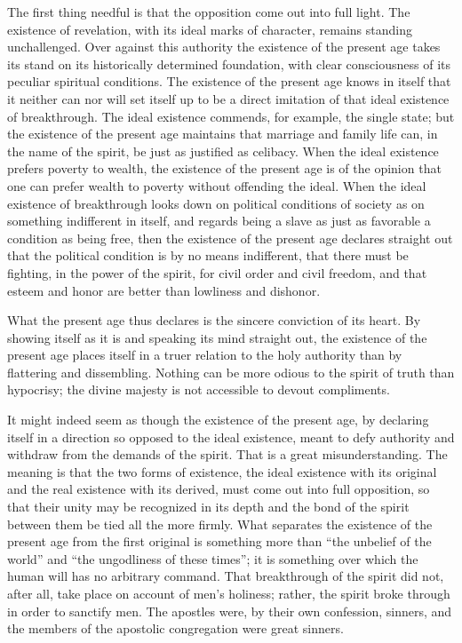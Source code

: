 \documentclass[12pt,a4paper,openany]{book}
\newcommand{\opage}[1]{\marginnote{\footnotesize\textit{[#1]}}}
\begin{document}
The first thing needful is that the opposition come out into full light.
The existence of revelation, with its ideal marks of character, remains
standing unchallenged. Over against this authority the existence of the
present age takes its stand on its historically determined foundation,
with clear consciousness \opage{96}of its peculiar spiritual conditions. The
existence of the present age knows in itself that it neither can nor will
set itself up to be a direct imitation of that ideal existence of
breakthrough. The ideal existence commends, for example, the single
state; but the existence of the present age maintains that marriage and
family life can, in the name of the spirit, be just as justified as
celibacy. When the ideal existence prefers poverty to wealth, the
existence of the present age is of the opinion that one can prefer wealth
to poverty without offending the ideal. When the ideal existence of
breakthrough looks down on political conditions of society as on
something indifferent in itself, and regards being a slave as just as
favorable a condition as being free, then the existence of the present
age declares straight out that the political condition is by no means
indifferent, that there must be fighting, in the power of the spirit, for
civil order and civil freedom, and that esteem and honor are better than
lowliness and dishonor.

What the present age thus declares is the sincere conviction of its
heart. By showing itself as it is and speaking its mind straight out, the
existence of the present age places itself in a truer relation to the
holy authority than by flattering and dissembling. Nothing can be more
odious to the spirit of truth than hypocrisy; the divine majesty is not
accessible to devout compliments.

It might indeed seem as though the existence of the present age, by
declaring itself in a direction so opposed to the ideal existence, meant
to defy authority and withdraw from the demands of the spirit. That is a
great misunderstanding. The meaning is that the two forms of existence,
the ideal existence with its original and the real existence with its
derived, must \opage{97}come out into full opposition, so that their unity may be
recognized in its depth and the bond of the spirit between them be tied
all the more firmly. What separates the existence of the present age from
the first original is something more than ``the unbelief of the world''
and ``the ungodliness of these times''; it is something over which the
human will has no arbitrary command. That breakthrough of the spirit did
not, after all, take place on account of men's holiness; rather, the
spirit broke through in order to sanctify men. The apostles were, by
their own confession, sinners, and the members of the apostolic
congregation were great sinners.
\end{document}
